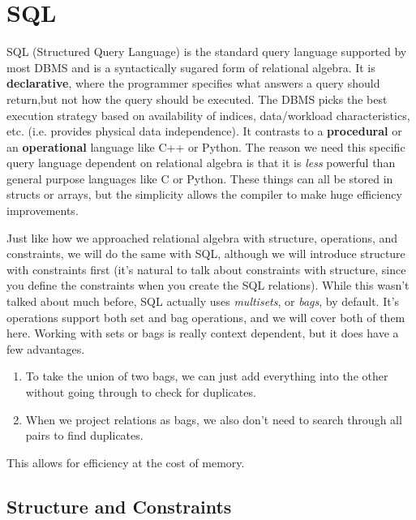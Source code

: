 \section{SQL} 

  SQL (Structured Query Language) is the standard query language supported by most DBMS and is a syntactically sugared form of relational algebra. It is \textbf{declarative}, where the programmer specifies what answers a query should return,but not how the query should be executed. The DBMS picks the best execution strategy based on availability of indices, data/workload characteristics, etc. (i.e. provides physical data independence). It contrasts to a \textbf{procedural} or an \textbf{operational} language like C++ or Python. The reason we need this specific query language dependent on relational algebra is that it is \textit{less} powerful than general purpose languages like C or Python. These things can all be stored in structs or arrays, but the simplicity allows the compiler to make huge efficiency improvements. 

  Just like how we approached relational algebra with structure, operations, and constraints, we will do the same with SQL, although we will introduce structure with constraints first (it's natural to talk about constraints with structure, since you define the constraints when you create the SQL relations). While this wasn't talked about much before, SQL actually uses \textit{multisets}, or \textit{bags}, by default. It's operations support both set and bag operations, and we will cover both of them here. Working with sets or bags is really context dependent, but it does have a few advantages. 
  \begin{enumerate}
    \item To take the union of two bags, we can just add everything into the other without going through to check for duplicates. 
    \item When we project relations as bags, we also don't need to search through all pairs to find duplicates. 
  \end{enumerate}
  This allows for efficiency at the cost of memory. 

\subsection{Structure and Constraints}

